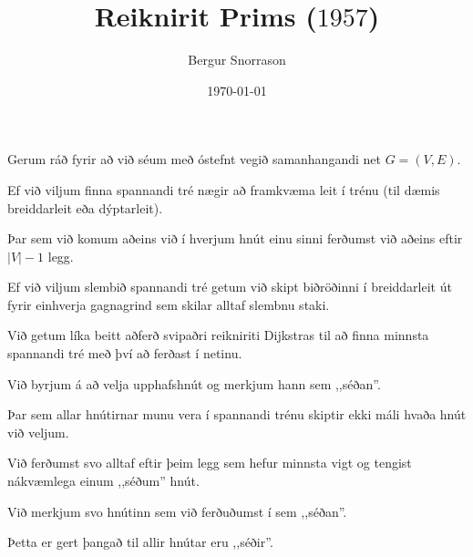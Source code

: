 \title{Reiknirit Prims ($1957$)}
\author{Bergur Snorrason}
\date{\today}



\frame{\titlepage}

{
	{
		\item<1-> Gerum ráð fyrir að við séum með óstefnt vegið samanhangandi net $G = (V, E)$.
		\item<2-> Ef við viljum finna spannandi tré nægir að framkvæma leit í trénu (til dæmis breiddarleit eða dýptarleit).
		\item<3-> Þar sem við komum aðeins við í hverjum hnút einu sinni ferðumst við aðeins eftir $|V| - 1$ legg.
		\item<4-> Ef við viljum slembið spannandi tré getum við skipt biðröðinni í breiddarleit út fyrir einhverja gagnagrind
					sem skilar alltaf slembnu staki.
	}
}

{
	{
		\item<1-> Við getum líka beitt aðferð svipaðri reikniriti Dijkstras til að finna minnsta spannandi tré með því að ferðast í netinu.
		\item<2-> Við byrjum á að velja upphafshnút og merkjum hann sem ,,séðan''.
		\item<3-> Þar sem allar hnútirnar munu vera í spannandi trénu skiptir ekki máli hvaða hnút við veljum.
		\item<4-> Við ferðumst svo alltaf eftir þeim legg sem hefur minnsta vigt og tengist nákvæmlega einum ,,séðum'' hnút.
		\item<5-> Við merkjum svo hnútinn sem við ferðuðumst í sem ,,séðan''.
		\item<6-> Þetta er gert þangað til allir hnútar eru ,,séðir''.
	}
}

